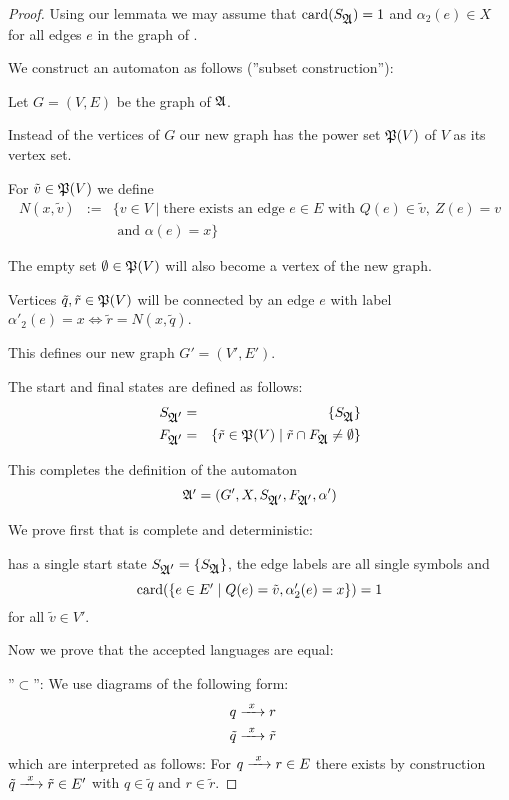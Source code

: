 \begin{proof}
Using our lemmata we may assume that $\mathrm{card}({S_{\mbox{$\mathfrak{A}$}}}) = 1$ and
$\alpha_2(e) \in X$ for all edges $e$ in the graph of .

We construct an automaton  as follows (''subset construction''):

Let $G = (V,E)$ be the graph of $\mbox{$\mathfrak{A}$}$.

Instead of the vertices of $G$ our new graph has the power set $\mathfrak{P}({V})$ of
$V$ as its vertex set.

For $\tilde{v} \in \mathfrak{P}({V})$ we define 
\begin{eqnarray*}
N(x, \tilde{v}) &:=& \{ v \in V \mid \text{there exists an edge } e \in E
\text{ with }Q(e) \in \tilde{v},\ Z(e) = v \\
&& \text{ and } \alpha(e) = x \}
\end{eqnarray*}

The empty set $\emptyset \in \mathfrak{P}({V})$ will also become a vertex of the new
graph.

Vertices $\tilde{q}, \tilde{r} \in \mathfrak{P}({V})$ will be connected by an edge $e$
with label $\alpha'_2(e) = x \Leftrightarrow \tilde{r} = N(x, \tilde{q})$.

This defines our new graph $G' = (V', E')$.

The start and final states are defined as follows:
\begin{eqnarray*}
S_{\mbox{$\mathfrak{A'}$}} &=& \mbox{$\{S_{\mbox{$\mathfrak{A}$}}\}$} \\
F_{\mbox{$\mathfrak{A'}$}} &=& \mbox{$\{\tilde{r} \in \mathfrak{P}({V}) \mid \tilde{r} \cap F_{\mbox{$\mathfrak{A}$}}
\neq \emptyset\}$}
\end{eqnarray*}

This completes the definition of the automaton
\[ \mbox{$\mathfrak{A'}$} = (G', X, S_{\mbox{$\mathfrak{A'}$}}, F_{\mbox{$\mathfrak{A'}$}}, \alpha') \]

We prove first that  is complete and deterministic:

 has a single start state $S_{\mbox{$\mathfrak{A'}$}} = \mbox{$\{S_{\mbox{$\mathfrak{A}$}}\}$}$, 
the edge labels are all single symbols and 
\[ \mathrm{card}({\mbox{$\{e \in E' \mid Q(e) = \tilde{v}, \alpha'_2(e) = x\}$}}) = 1 \]
for all $\tilde{v} \in V'$.

Now we prove that the accepted languages are equal:

''$\subset$'': We use diagrams of the following form:
\begin{eqnarray*}
& q \xrightarrow{\ {x}\ } r & \\
& \tilde{q} \xrightarrow{\ {x}\ } \tilde{r} &
\end{eqnarray*}
which are interpreted as follows: For $q \xrightarrow{\ {x}\ } r \in E$ there exists by
construction $\tilde{q} \xrightarrow{\ {x}\ } \tilde{r} \in E'$ with $q \in \tilde{q}$ and
$r \in \tilde{r}$.


\end{proof}
